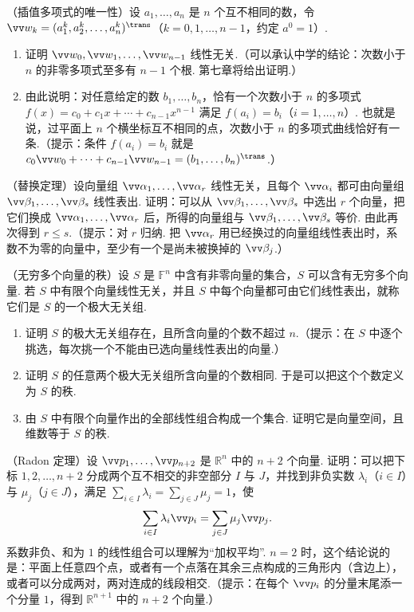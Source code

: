 {		\Cgroup
		\begin{exC}
			\item\label{ex:vs:C1} （插值多项式的唯一性）设 $a_1,\ldots,a_n$ 是 $n$ 个互不相同的数，令 $\vv w_k=(a_1^k,a_2^k,\ldots,a_n^k)^\trans$（$k=0,1,\ldots,n-1$，约定 $a^0=1$）.
			\begin{enumerate}
				\item 证明 $\vv w_0,\vv w_1,\ldots,\vv w_{n-1}$ 线性无关.（可以承认中学的结论：次数小于 $n$ 的非零多项式至多有 $n-1$ 个根. 第七章将给出证明.）
				\item 由此说明：对任意给定的数 $b_1,\ldots,b_n$，恰有一个次数小于 $n$ 的多项式 $f(x)=c_0+c_1x+\cdots+c_{n-1}x^{n-1}$ 满足 $f(a_i)=b_i$（$i=1,\ldots,n$）. 也就是说，过平面上 $n$ 个横坐标互不相同的点，次数小于 $n$ 的多项式曲线恰好有一条.（提示：条件 $f(a_i)=b_i$ 就是 $c_0\vv w_0+\cdots+c_{n-1}\vv w_{n-1}=(b_1,\ldots,b_n)^\trans$.）
			\end{enumerate}
			\item\label{ex:vs:C2} （替换定理）设向量组 $\vv\alpha_1,\ldots,\vv\alpha_r$ 线性无关，且每个 $\vv\alpha_i$ 都可由向量组 $\vv\beta_1,\ldots,\vv\beta_s$ 线性表出. 证明：可以从 $\vv\beta_1,\ldots,\vv\beta_s$ 中选出 $r$ 个向量，把它们换成 $\vv\alpha_1,\ldots,\vv\alpha_r$ 后，所得的向量组与 $\vv\beta_1,\ldots,\vv\beta_s$ 等价. 由此再次得到 $r\le s$.（提示：对 $r$ 归纳. 把 $\vv\alpha_r$ 用已经换过的向量组线性表出时，系数不为零的向量中，至少有一个是尚未被换掉的 $\vv\beta_j$.）
			\item\label{ex:vs:C3} （无穷多个向量的秩）设 $S$ 是 $\mathbb{F}^n$ 中含有非零向量的集合，$S$ 可以含有无穷多个向量. 若 $S$ 中有限个向量线性无关，并且 $S$ 中每个向量都可由它们线性表出，就称它们是 $S$ 的一个极大无关组.
			\begin{enumerate}
				\item 证明 $S$ 的极大无关组存在，且所含向量的个数不超过 $n$.（提示：在 $S$ 中逐个挑选，每次挑一个不能由已选向量线性表出的向量.）
				\item 证明 $S$ 的任意两个极大无关组所含向量的个数相同. 于是可以把这个个数定义为 $S$ 的秩.
				\item 由 $S$ 中有限个向量作出的全部线性组合构成一个集合. 证明它是向量空间，且维数等于 $S$ 的秩.
			\end{enumerate}
			\item\label{ex:vs:C4} （Radon 定理）设 $\vv p_1,\ldots,\vv p_{n+2}$ 是 $\mathbb{R}^n$ 中的 $n+2$ 个向量. 证明：可以把下标 $1,2,\ldots,n+2$ 分成两个互不相交的非空部分 $I$ 与 $J$，并找到非负实数 $\lambda_i$（$i\in I$）与 $\mu_j$（$j\in J$），满足 $\sum_{i\in I}\lambda_i=\sum_{j\in J}\mu_j=1$，使
			\[\sum_{i\in I}\lambda_i\vv p_i=\sum_{j\in J}\mu_j\vv p_j.\]
			系数非负、和为 $1$ 的线性组合可以理解为“加权平均”. $n=2$ 时，这个结论说的是：平面上任意四个点，或者有一个点落在其余三点构成的三角形内（含边上），或者可以分成两对，两对连成的线段相交.（提示：在每个 $\vv p_i$ 的分量末尾添一个分量 $1$，得到 $\mathbb{R}^{n+1}$ 中的 $n+2$ 个向量.）
		\end{exC}

	}
	
